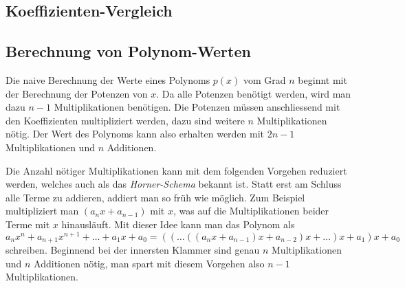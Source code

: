 %
%
\subsection{Koeffizienten-Vergleich}

\subsection{Berechnung von Polynom-Werten}
Die naive Berechnung der Werte eines Polynoms $p(x)$ vom Grad $n$
beginnt mit der Berechnung der Potenzen von $x$.
Da alle Potenzen benötigt werden, wird man dazu $n-1$ Multiplikationen
benötigen.
Die Potenzen müssen anschliessend mit den Koeffizienten multipliziert
werden, dazu sind weitere $n$ Multiplikationen nötig.
Der Wert des Polynoms kann also erhalten werden mit $2n-1$ Multiplikationen
und $n$ Additionen.

Die Anzahl nötiger Multiplikationen kann mit dem folgenden Vorgehen
reduziert werden, welches auch als das {\em Horner-Schema} bekannt ist.
%
Statt erst am Schluss alle Terme zu addieren, addiert man so früh
wie möglich.
Zum Beispiel multipliziert man $(a_nx+a_{n-1})$ mit $x$, was auf
die Multiplikationen beider Terme mit $x$ hinausläuft.
Mit dieser Idee kann man das Polynom als
\[
a_nx^n
+
a_{n+1}x^{n+1}
+
\dots
+
a_1x
+
a_0
=
((\dots((a_nx+a_{n-1})x+a_{n-2})x+\dots )x+a_1)x+a_0
\]
schreiben.
Beginnend bei der innersten Klammer sind genau $n$ Multiplikationen
und $n$ Additionen nötig, man spart mit diesem Vorgehen also
$n-1$ Multiplikationen. 



